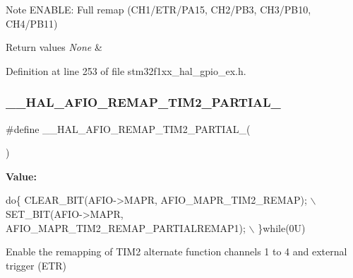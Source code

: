 \begin{DoxyNote}{Note}
E\+N\+A\+B\+LE\+: Full remap (C\+H1/\+E\+T\+R/\+P\+A15, C\+H2/\+P\+B3, C\+H3/\+P\+B10, C\+H4/\+P\+B11) 
\end{DoxyNote}

\begin{DoxyRetVals}{Return values}
{\em None} & \\
\hline
\end{DoxyRetVals}


Definition at line 253 of file stm32f1xx\+\_\+hal\+\_\+gpio\+\_\+ex.\+h.

\mbox{\label{group___g_p_i_o_ex___a_f_i_o___a_f___r_e_m_a_p_p_i_n_g_ga3ffee1bceaa141be048b7f60c11c0943}} 
\subsubsection{\texorpdfstring{\+\_\+\+\_\+\+H\+A\+L\+\_\+\+A\+F\+I\+O\+\_\+\+R\+E\+M\+A\+P\+\_\+\+T\+I\+M2\+\_\+\+P\+A\+R\+T\+I\+A\+L\+\_}{\_\_HAL\_AFIO\_REMAP\_TIM2\_PARTIAL\_1}}
{\footnotesize\ttfamily \#define \+\_\+\+\_\+\+H\+A\+L\+\_\+\+A\+F\+I\+O\+\_\+\+R\+E\+M\+A\+P\+\_\+\+T\+I\+M2\+\_\+\+P\+A\+R\+T\+I\+A\+L\+\_(\begin{DoxyParamCaption}{ }\end{DoxyParamCaption})}

{\bfseries Value\+:}
\begin{DoxyCode}
\textcolor{keywordflow}{do}\{ CLEAR\_BIT(AFIO->MAPR, AFIO\_MAPR\_TIM2\_REMAP);             \(\backslash\)
                                               SET\_BIT(AFIO->MAPR, AFIO\_MAPR\_TIM2\_REMAP\_PARTIALREMAP1); \(\backslash\)
                                             \}\textcolor{keywordflow}{while}(0U)
\end{DoxyCode}


Enable the remapping of T\+I\+M2 alternate function channels 1 to 4 and external trigger (E\+TR) 

